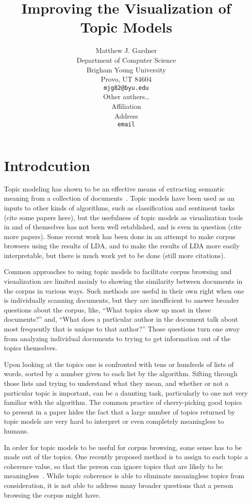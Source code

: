 \documentclass{article}
\title{Improving the Visualization of Topic Models}
\author{
Matthew J. Gardner \\
Department of Computer Science \\
Brigham Young University \\
Provo, UT 84604 \\
\texttt{mjg82@byu.edu} \\
\And
Other authers\ldots \\
Affiliation \\
Address \\
\texttt{email} \\
}
\begin{document}
\maketitle

\begin{abstract}
\end{abstract}

\section{Introdcution}

Topic modeling has shown to be an effective means of extracting semantic
meaning from a collection of
documents~\cite{blei-2003-latent-dirichlet-allocation}.  Topic models have been
used as an inputs to other kinds of algorithms, such as classification and
sentiment tasks (cite some papers here), but the usefulness of topic models as
visualization tools in and of themselves has not been well established, and is
even in question (cite more papers).  Some recent work has been done in an
attempt to make corpus browsers using the results of LDA, and to make the
results of LDA more easily interpretable, but there is much work yet to be done
(still more citations).  

Common approaches to using topic models to facilitate corpus browsing and
visualization are limited mainly to showing the similarity between documents in
the corpus in various ways.  Such methods are useful in their own right when
one is individually scanning documents, but they are insufficient to answer
broader questions about the corpus, like, ``What topics show up most in these
documents?'' and, ``What does a particular author in the document talk about
most frequently that is unique to that author?''  Those questions turn one away
from analyzing individual documents to trying to get information out of the
topics themselves.

Upon looking at the topics one is confronted with tens or hundreds of lists of
words, sorted by a number given to each list by the algorithm.  Sifting through
those lists and trying to understand what they mean, and whether or not a
particular topic is important, can be a daunting task, particularly to one not
very familiar with the algorithm.  The common practice of cherry-picking good
topics to present in a paper hides the fact that a large number of topics
returned by topic models are very hard to interpret or even completely
meaningless to humans.

In order for topic models to be useful for corpus browsing, some sense has to
be made out of the topics.  One recently proposed method is to assign to each
topic a coherence value, so that the person can ignore topics that are likely
to be meaningless~\cite{newman-2010-automatic-evaluation-of-topic-coherence}.
While topic coherence is able to eliminate meaningless topics from
consideration, it is not able to address many broader questions that a person
browsing the corpus might have.
\end{document}
